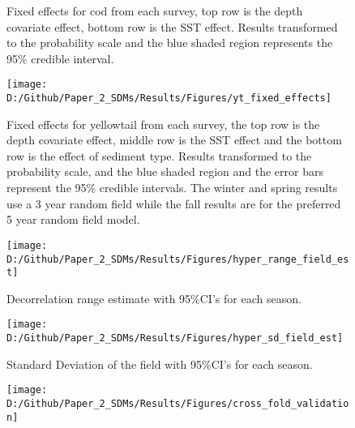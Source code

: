 \documentclass[
]{article}
\begin{document}
\begin{landscape}
\begin{figure}[htb]
{}

\caption{Fixed effects for cod from each survey, top row is the depth covariate effect, bottom row is the SST effect. Results transformed to the probability scale and the blue shaded region represents the 95\% credible interval.}\label{fig:cod-fe}
\end{figure}

\newpage
\begin{figure}[htb]

{\centering \texttt{[image: D:/Github/Paper\_2\_SDMs/Results/Figures/yt\_fixed\_effects]} 

}

\caption{Fixed effects for yellowtail from each survey, the top row is the depth covariate effect, middle row is the SST effect and the bottom row is the effect of sediment type. Results transformed to the probability scale, and the blue shaded region and the error bars represent the 95\% credible intervals. The winter and spring results use a 3 year random field while the fall results are for the preferred 5 year random field model.}\label{fig:yt-fe}
\end{figure}

\clearpage

\begin{figure}[htb]

{\centering \texttt{[image: D:/Github/Paper\_2\_SDMs/Results/Figures/hyper\_range\_field\_est]} 

}

\caption{Decorrelation range estimate with 95\%CI's for each season.}\label{fig:hyper-range-var-est}
\end{figure}

\clearpage

\begin{figure}[htb]

{\centering \texttt{[image: D:/Github/Paper\_2\_SDMs/Results/Figures/hyper\_sd\_field\_est]} 

}

\caption{Standard Deviation of the field with 95\%CI's for each season.}\label{fig:hyper-sd-var-est}
\end{figure}

\newpage
\begin{figure}[htb]

{\centering \texttt{[image: D:/Github/Paper\_2\_SDMs/Results/Figures/cross\_fold\_validation]} 

}


\end{figure}
\end{landscape}
\end{document}
